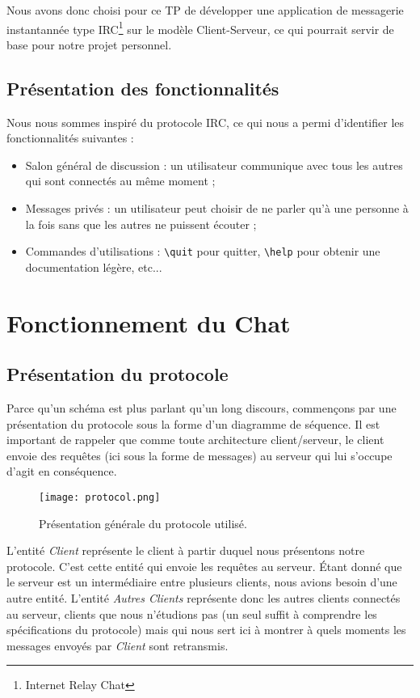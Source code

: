 		Nous avons donc choisi pour ce TP de développer une application de messagerie instantannée type IRC\footnote{Internet Relay Chat} sur le modèle Client-Serveur, ce qui pourrait servir de base pour notre projet personnel.
		

	\section{Présentation des fonctionnalités}
		Nous nous sommes inspiré du protocole IRC, ce qui nous a permi d'identifier les fonctionnalités suivantes :
		\begin{itemize}
			\item Salon général de discussion : un utilisateur communique avec tous les autres qui sont connectés au même moment ;
			\item Messages privés : un utilisateur peut choisir de ne parler qu'à une personne à la fois sans que les autres ne puissent écouter ;
			\item Commandes d'utilisations : \verb!\quit! pour quitter, \verb!\help! pour obtenir une documentation légère, etc...
		\end{itemize}
		

\chapter{Fonctionnement du Chat}
	
	\section{Présentation du protocole}
		Parce qu'un schéma est plus parlant qu'un long discours, commençons par une présentation du protocole sous la forme d'un diagramme de séquence. Il est important de rappeler que comme toute architecture client/serveur, le client envoie des requêtes (ici sous la forme de messages) au serveur qui lui s'occupe d'agit en conséquence.
		\begin{figure}[h!]
			\centering
			\texttt{[image: protocol.png]}
			\caption{Présentation générale du protocole utilisé.}
		\end{figure}
		\FloatBarrier
		
		L'entité \emph{Client} représente le client à partir duquel nous présentons notre protocole. C'est cette entité qui envoie les requêtes au serveur. Étant donné que le serveur est un intermédiaire entre plusieurs clients, nous avions besoin d'une autre entité. L'entité \emph{Autres Clients} représente donc les autres clients connectés au serveur, clients que nous n'étudions pas (un seul suffit à comprendre les spécifications du protocole) mais qui nous sert ici à montrer à quels moments les messages envoyés par \emph{Client} sont retransmis.\\
		
